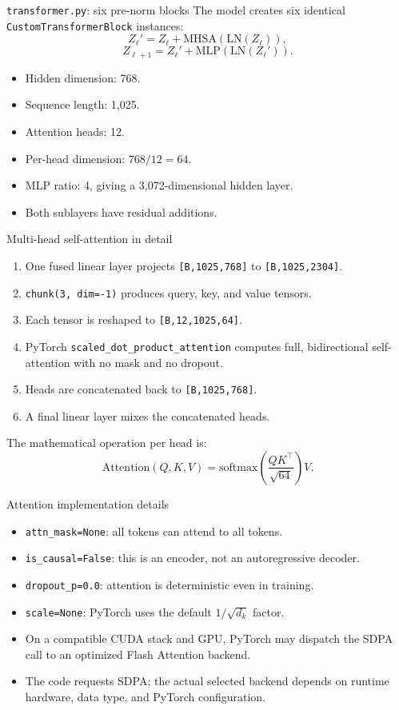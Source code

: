 \documentclass[aspectratio=169,10pt]{beamer}
\newcommand{\shape}[1]{\texttt{#1}}
\newcommand{\file}[1]{\texttt{#1}}
\newcommand{\code}[1]{\texttt{#1}}
\begin{document}
\begin{frame}{\file{transformer.py}: six pre-norm blocks}
  The model creates six identical \code{CustomTransformerBlock} instances:
  \[
    Z_{\ell}' = Z_{\ell} + \mathrm{MHSA}(\mathrm{LN}(Z_{\ell})),
  \]
  \[
    Z_{\ell+1} = Z_{\ell}' + \mathrm{MLP}(\mathrm{LN}(Z_{\ell}')).
  \]
  \begin{itemize}
    \item Hidden dimension: 768.
    \item Sequence length: 1,025.
    \item Attention heads: 12.
    \item Per-head dimension: $768/12=64$.
    \item MLP ratio: 4, giving a 3,072-dimensional hidden layer.
    \item Both sublayers have residual additions.
  \end{itemize}
\end{frame}

\begin{frame}{Multi-head self-attention in detail}
  \begin{enumerate}
    \item One fused linear layer projects \shape{[B,1025,768]} to
          \shape{[B,1025,2304]}.
    \item \code{chunk(3, dim=-1)} produces query, key, and value tensors.
    \item Each tensor is reshaped to \shape{[B,12,1025,64]}.
    \item PyTorch \code{scaled\_dot\_product\_attention} computes full,
          bidirectional self-attention with no mask and no dropout.
    \item Heads are concatenated back to \shape{[B,1025,768]}.
    \item A final linear layer mixes the concatenated heads.
  \end{enumerate}
  The mathematical operation per head is:
  \[
    \mathrm{Attention}(Q,K,V)=
    \mathrm{softmax}\left(\frac{QK^\top}{\sqrt{64}}\right)V.
  \]
\end{frame}

\begin{frame}{Attention implementation details}
  \begin{itemize}
    \item \code{attn\_mask=None}: all tokens can attend to all tokens.
    \item \code{is\_causal=False}: this is an encoder, not an autoregressive decoder.
    \item \code{dropout\_p=0.0}: attention is deterministic even in training.
    \item \code{scale=None}: PyTorch uses the default $1/\sqrt{d_k}$ factor.
    \item On a compatible CUDA stack and GPU, PyTorch may dispatch the SDPA call
          to an optimized Flash Attention backend.
    \item The code requests SDPA; the actual selected backend depends on runtime
          hardware, data type, and PyTorch configuration.
  \end{itemize}
\end{frame}
\end{document}
